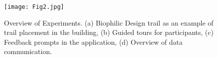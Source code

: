 \begin{figure}
\begin{center}
\texttt{[image: Fig2.jpg]}
\caption{Overview of Experiments. (a) Biophilic Design trail as an example of trail placement in the building, (b) Guided tours for participants, (c) Feedback prompts in the application, (d) Overview of data communication.}
\label{fig:experiments}
\end{center}
\end{figure}





